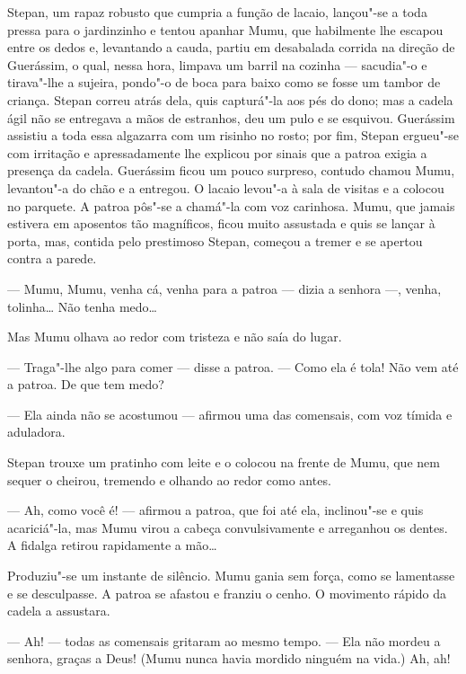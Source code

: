Stepan, um rapaz robusto que cumpria a função de lacaio, lançou"-se a
toda pressa para o jardinzinho e tentou apanhar Mumu, que habilmente lhe
escapou entre os dedos e, levantando a cauda, partiu em desabalada
corrida na direção de Guerássim, o qual, nessa hora, limpava um barril
na cozinha --- sacudia"-o e tirava"-lhe a sujeira, pondo"-o de boca para
baixo como se fosse um tambor de criança. Stepan correu atrás dela, quis
capturá"-la aos pés do dono; mas a cadela ágil não se entregava a mãos de
estranhos, deu um pulo e se esquivou. Guerássim assistiu a toda essa
algazarra com um risinho no rosto; por fim, Stepan ergueu"-se com
irritação e apressadamente lhe explicou por sinais que a patroa exigia a
presença da cadela. Guerássim ficou um pouco surpreso, contudo chamou
Mumu, levantou"-a do chão e a entregou. O lacaio levou"-a à sala de visitas
e a colocou no parquete. A patroa pôs"-se a chamá"-la com voz carinhosa.
Mumu, que jamais estivera em aposentos tão magníficos, ficou muito
assustada e quis se lançar à porta, mas, contida pelo prestimoso Stepan,
começou a tremer e se apertou contra a parede.

--- Mumu, Mumu, venha cá, venha para a patroa --- dizia a senhora ---,
venha, tolinha\ldots{} Não tenha medo\ldots{}


Mas Mumu olhava ao redor com tristeza e não saía do lugar.

--- Traga"-lhe algo para comer --- disse a patroa. --- Como ela é tola!
Não vem até a patroa. De que tem medo?

--- Ela ainda não se acostumou --- afirmou uma das comensais, com voz
tímida e aduladora.

Stepan trouxe um pratinho com leite e o colocou na frente de Mumu, que
nem sequer o cheirou, tremendo e olhando ao redor como antes.

--- Ah, como você é! --- afirmou a patroa, que foi até ela, inclinou"-se
e quis acariciá"-la, mas Mumu virou a cabeça convulsivamente e arreganhou
os dentes. A fidalga retirou rapidamente a mão\ldots{}

Produziu"-se um instante de silêncio. Mumu gania sem força, como se
lamentasse e se desculpasse. A patroa se afastou e franziu o cenho. O
movimento rápido da cadela a assustara.

--- Ah! --- todas as comensais gritaram ao mesmo tempo. --- Ela não
mordeu a senhora, graças a Deus! (Mumu nunca havia mordido ninguém na vida.) Ah, ah!

